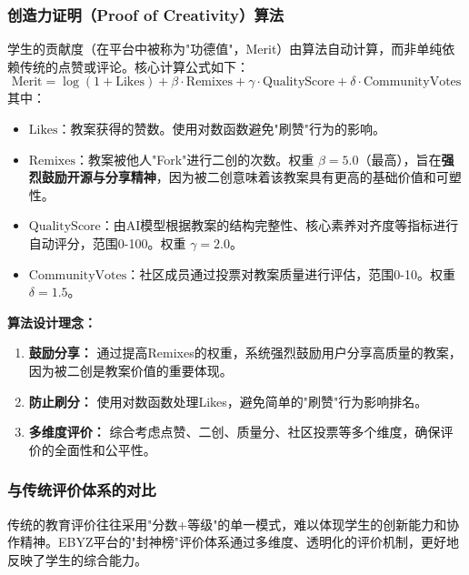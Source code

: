 \documentclass[12pt,a4paper,fontset=fandol]{ctexart}
\begin{document}
\subsubsection{创造力证明（Proof of Creativity）算法}
学生的贡献度（在平台中被称为"功德值"，Merit）由算法自动计算，而非单纯依赖传统的点赞或评论。核心计算公式如下：
\begin{equation}
    \text{Merit} = \log(1 + \text{Likes}) + \beta \cdot \text{Remixes} + \gamma \cdot \text{QualityScore} + \delta \cdot \text{CommunityVotes}
\end{equation}
其中：
\begin{itemize}
    \item $\text{Likes}$：教案获得的赞数。使用对数函数避免"刷赞"行为的影响。
    \item $\text{Remixes}$：教案被他人"Fork"进行二创的次数。权重 $\beta = 5.0$（最高），旨在\textbf{强烈鼓励开源与分享精神}，因为被二创意味着该教案具有更高的基础价值和可塑性。
    \item $\text{QualityScore}$：由AI模型根据教案的结构完整性、核心素养对齐度等指标进行自动评分，范围0-100。权重 $\gamma = 2.0$。
    \item $\text{CommunityVotes}$：社区成员通过投票对教案质量进行评估，范围0-10。权重 $\delta = 1.5$。
\end{itemize}

\textbf{算法设计理念：}
\begin{enumerate}
    \item \textbf{鼓励分享：} 通过提高Remixes的权重，系统强烈鼓励用户分享高质量的教案，因为被二创是教案价值的重要体现。
    \item \textbf{防止刷分：} 使用对数函数处理Likes，避免简单的"刷赞"行为影响排名。
    \item \textbf{多维度评价：} 综合考虑点赞、二创、质量分、社区投票等多个维度，确保评价的全面性和公平性。
\end{enumerate}

\subsubsection{与传统评价体系的对比}
传统的教育评价往往采用"分数+等级"的单一模式，难以体现学生的创新能力和协作精神。EBYZ平台的"封神榜"评价体系通过多维度、透明化的评价机制，更好地反映了学生的综合能力。
\end{document}
